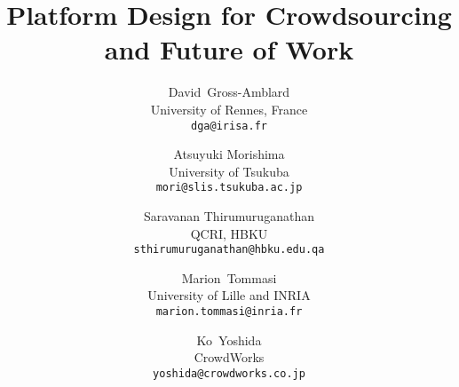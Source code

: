 \documentclass[11pt]{article}
\begin{document}
\title{Platform Design for Crowdsourcing and Future of Work}

\author{David\, Gross-Amblard\\
 University of Rennes, France\\
\texttt{{\footnotesize dga@irisa.fr}}
\and
Atsuyuki Morishima\\
University of Tsukuba\\
\texttt{{\footnotesize mori@slis.tsukuba.ac.jp}}
\and
Saravanan Thirumuruganathan\\
QCRI, HBKU\\
\texttt{{\footnotesize sthirumuruganathan@hbku.edu.qa}}
\and
Marion\, Tommasi\\
University of Lille and INRIA\\
\texttt{{\footnotesize marion.tommasi@inria.fr}}
\and
Ko\, Yoshida\\
CrowdWorks\\
\texttt{{\footnotesize yoshida@crowdworks.co.jp}}
}
\maketitle

\newcommand{\scream}[1]{\textbf{***#1***}}








\vspace{-.6cm}
\enlargethispage{1cm}

\end{document}
